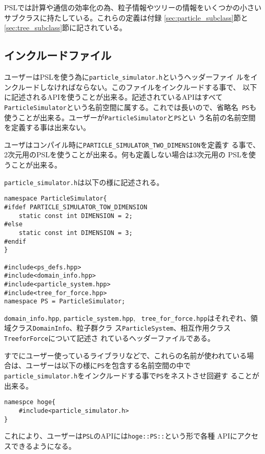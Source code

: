 \documentclass[12pt,a4paper]{jarticle}
\begin{document}
PSLでは計算や通信の効率化の為、粒子情報やツリーの情報をいくつかの小さい
サブクラスに持たしている。これらの定義は付録
\ref{sec:particle_subclass}節と\ref{sec:tree_subclass}節に記されている。

\subsection{インクルードファイル}
\label{sec:includefile}

ユーザーはPSLを使う為に{\tt particle\_simulator.h}というヘッダーファイ
ルをインクルードしなければならない。このファイルをインクルードする事で、
以下に記述されるAPIを使うことが出来る。記述されているAPIはすべて{\tt
ParticleSimulator}という名前空間に属する。これでは長いので、省略名{\tt
PS}も使うことが出来る。ユーザーが{\tt ParticleSimulator}と{\tt PS}とい
う名前の名前空間を定義する事は出来ない。

ユーザはコンパイル時に{\tt PARTICLE\_SIMULATOR\_TWO\_DIMENSION}を定義す
る事で、2次元用のPSLを使うことが出来る。何も定義しない場合は3次元用の
PSLを使うことが出来る。

{\tt particle\_simulator.h}は以下の様に記述される。

\begin{lstlisting}[caption={\tt particle\_simulator.h}]
namespace ParticleSimulator{
#ifdef PARTICLE_SIMULATOR_TOW_DIMENSION
    static const int DIMENSION = 2;
#else
    static const int DIMENSION = 3;
#endif
}

#include<ps_defs.hpp>
#include<domain_info.hpp>
#include<particle_system.hpp>
#include<tree_for_force.hpp>
namespace PS = ParticleSimulator;
\end{lstlisting}

{\tt domain\_info.hpp}, {\tt particle\_system.hpp}, {\tt
tree\_for\_force.hpp}はそれぞれ、領域クラス{\tt DomainInfo}、粒子群クラ
ス{\tt ParticleSystem}、相互作用クラス{\tt TreeforForce}について記述さ
れているヘッダーファイルである。

すでにユーザー使っているライブラリなどで、これらの名前が使われている場
合は、ユーザーは以下の様に{\tt PS}を包含する名前空間の中で{\tt
particle\_simulator.h}をインクルードする事で{\tt PS}をネストさせ回避す
ることが出来る。

\begin{lstlisting}[caption=名前空間の衝突の回避方法]
namespce hoge{
    #include<particle_simulator.h>
}
\end{lstlisting}

これにより、ユーザーは{\tt PSL}のAPIには{\tt hoge::PS::}という形で各種
APIにアクセスできるようになる。
\end{document}

